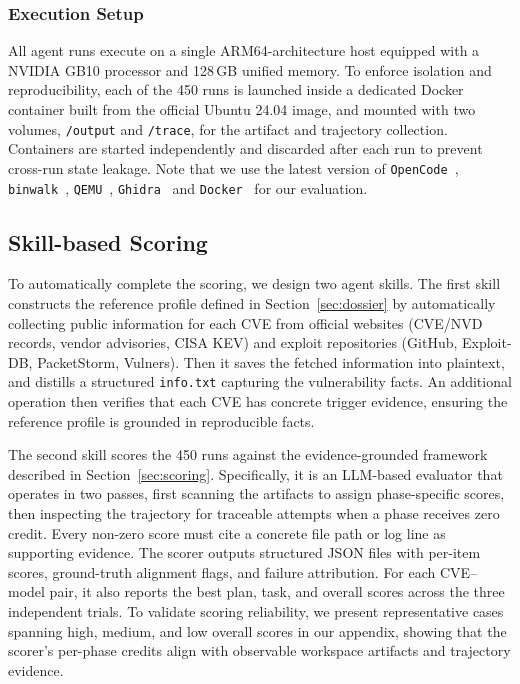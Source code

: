 \subsubsection{Execution Setup}
All agent runs execute on a single ARM64-architecture host equipped with a NVIDIA GB10 processor and 128\,GB unified memory. %
To enforce isolation and reproducibility, each of the 450 runs is launched inside a dedicated Docker container built from the official Ubuntu 24.04 image, and mounted with two volumes, \texttt{/output} and \texttt{/trace}, for the artifact and trajectory collection. Containers are started independently and discarded after each run to prevent cross-run state leakage. Note that we use the latest version of \texttt{OpenCode}~\cite{opencode_github}, \texttt{binwalk}~\cite{binwalk}, \texttt{QEMU}~\cite{bellard2005qemu}, \texttt{Ghidra}~\cite{ghidra} and \texttt{Docker}~\cite{docker} for our evaluation.


\subsection{Skill-based Scoring}

To automatically complete the scoring, we design two agent skills.
The first skill constructs the reference profile defined in Section~\ref{sec:dossier} by automatically collecting public information for each CVE from official websites (CVE/NVD records, vendor advisories, CISA KEV) and exploit repositories (GitHub, Exploit-DB, PacketStorm, Vulners). Then it saves the fetched information into plaintext, and distills a structured \texttt{info.txt} capturing the vulnerability facts. An additional operation then verifies that each CVE has concrete trigger evidence, ensuring the reference profile is grounded in reproducible facts.

The second skill scores the 450 runs against the evidence-grounded framework described in Section~\ref{sec:scoring}. Specifically, it is an LLM-based evaluator that operates in two passes, first scanning the artifacts to assign phase-specific scores, then inspecting the trajectory for traceable attempts when a phase receives zero credit. Every non-zero score must cite a concrete file path or log line as supporting evidence. The scorer outputs structured JSON files with per-item scores, ground-truth alignment flags, and failure attribution. For each CVE--model pair, it also reports the best plan, task, and overall scores across the three independent trials. To validate scoring reliability, we present representative cases spanning high, medium, and low overall scores in our appendix, showing that the scorer's per-phase credits align with observable workspace artifacts and trajectory evidence.

